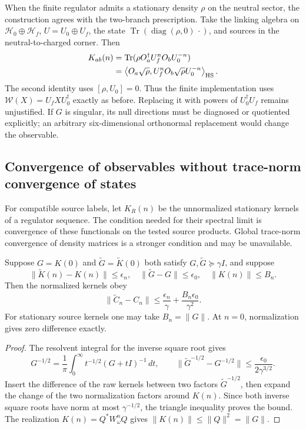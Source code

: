 When the finite regulator admits a stationary density $\rho$ on the neutral
sector, the construction agrees with the two-branch prescription. Take the
linking algebra on $\mathcal H_0\oplus\mathcal H_f$,
$U=U_0\oplus U_f$, the state $\operatorname{Tr}(\operatorname{diag}(\rho,0)\,
\cdot)$, and sources in the neutral-to-charged corner. Then
\begin{align}
 K_{ab}(n)
 &=\operatorname{Tr}(\rho O_a^\dagger U_f^nO_bU_0^{-n})\\
 &=\left\langle O_a\sqrt\rho,
           U_f^nO_b\sqrt\rho U_0^{-n}\right\rangle_{\rm HS}.
 \label{eq:algebraic-finite-equivalence}
\end{align}
The second identity uses $[\rho,U_0]=0$. Thus the finite implementation uses
$\mathcal W(X)=U_fXU_0^\dagger$ exactly as before. Replacing it with powers
of $U_0^\dagger U_f$ remains unjustified. If $G$ is singular, its null
directions must be diagnosed or quotiented explicitly; an arbitrary
six-dimensional orthonormal replacement would change the observable.

\subsection{Convergence of observables without trace-norm convergence of states}

For compatible source labels, let $K_R(n)$ be the unnormalized stationary
kernels of a regulator sequence. The condition needed for their spectral
limit is convergence of these functionals on the tested source products.
Global trace-norm convergence of density matrices is a stronger condition
and may be unavailable.

\begin{proposition}
\label{prop:algebraic-kernel-error}
Suppose $G=K(0)$ and $\widetilde G=\widetilde K(0)$ both satisfy
$G,\widetilde G\succeq\gamma I$, and suppose
\[
 \|\widetilde K(n)-K(n)\|\leq\epsilon_n,\quad
 \|\widetilde G-G\|\leq\epsilon_0,\quad \|K(n)\|\leq B_n.
\]
Then the normalized kernels obey
\begin{equation}
 \|\widetilde C_n-C_n\|
 \leq\frac{\epsilon_n}{\gamma}
       +\frac{B_n\epsilon_0}{\gamma^2}.
 \label{eq:algebraic-kernel-error}
\end{equation}
For stationary source kernels one may take $B_n=\|G\|$. At $n=0$,
normalization gives zero difference exactly.
\end{proposition}
\begin{proof}
The resolvent integral for the inverse square root gives
\[
 G^{-1/2}=\frac1\pi\int_0^\infty
 t^{-1/2}(G+tI)^{-1}\,dt,
\qquad
 \|\widetilde G^{-1/2}-G^{-1/2}\|
 \leq\frac{\epsilon_0}{2\gamma^{3/2}}.
\]
Insert the difference of the raw kernels between two factors
$\widetilde G^{-1/2}$, then expand the change of the two normalization
factors around $K(n)$. Since both inverse square roots have norm at most
$\gamma^{-1/2}$, the triangle inequality proves the bound. The realization
$K(n)=Q^*W_\omega^nQ$ gives $\|K(n)\|\leq\|Q\|^2=\|G\|$.
\end{proof}

